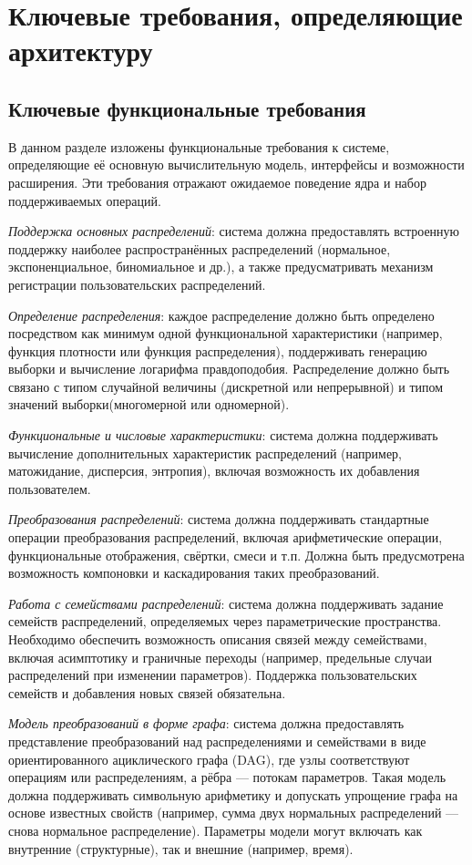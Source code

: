 \chapter{Ключевые требования, определяющие архитектуру}


\section{Ключевые функциональные требования}
В данном разделе изложены функциональные требования к системе, определяющие её основную вычислительную модель, интерфейсы и возможности расширения. Эти требования отражают ожидаемое поведение ядра и набор поддерживаемых операций.

\begin{itemizecmp}
    \item \textit{Поддержка основных распределений}: система должна предоставлять встроенную поддержку наиболее распространённых распределений (нормальное, экспоненциальное, биномиальное и др.), а также предусматривать механизм регистрации пользовательских распределений.
    \item \textit{Определение распределения}: каждое распределение должно быть определено посредством как минимум одной функциональной характеристики (например, функция плотности или функция распределения), поддерживать генерацию выборки и вычисление логарифма правдоподобия. Распределение должно быть связано с типом случайной величины (дискретной или непрерывной) и типом значений выборки(многомерной или одномерной).
    \item \textit{Функциональные и числовые характеристики}: система должна поддерживать вычисление дополнительных характеристик распределений (например, матожидание, дисперсия, энтропия), включая возможность их  добавления пользователем.
    \item \textit{Преобразования распределений}: система должна поддерживать стандартные операции преобразования распределений, включая арифметические операции, функциональные отображения, свёртки, смеси и т.п. Должна быть предусмотрена возможность компоновки и каскадирования таких преобразований.
    \item \textit{Работа с семействами распределений}: система должна поддерживать задание семейств распределений, определяемых через параметрические пространства. Необходимо обеспечить возможность описания связей между семействами, включая асимптотику и граничные переходы (например, предельные случаи распределений при изменении параметров). Поддержка пользовательских семейств и добавления новых связей обязательна.
    \item \textit{Модель преобразований в форме графа}: система должна предоставлять представление преобразований над распределениями и семействами в виде ориентированного ациклического графа (DAG), где узлы соответствуют операциям или распределениям, а рёбра — потокам параметров. Такая модель должна поддерживать символьную арифметику и допускать упрощение графа на основе известных свойств (например, сумма двух нормальных распределений — снова нормальное распределение). Параметры модели могут включать как внутренние (структурные), так и внешние (например, время).
\end{itemizecmp}

